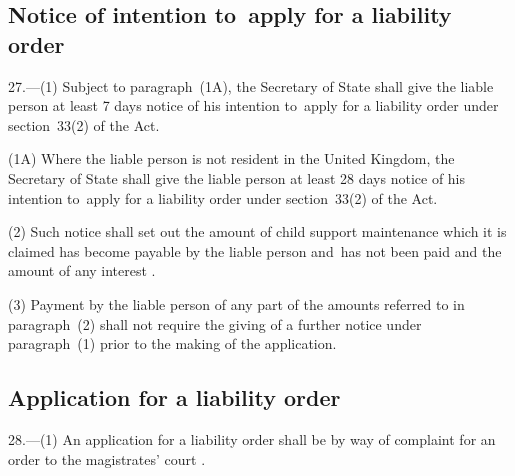 \documentclass[12pt,a4paper]{article}
\begin{document}
\subsection[27. Notice of intention to~apply for a liability order]{Notice of intention to~apply for a liability order}

27.—(1) 
Subject to paragraph~(1A),  %
the Secretary of State shall give the liable person at least 7 days notice of his intention to~apply for a liability order under section~33(2) of the Act.

(1A) Where the liable person is not resident in the United Kingdom, the Secretary of State shall give the liable person at least 28 days notice of his intention to~apply for a liability order under section~33(2) of the Act.

(2) Such notice shall set out the amount of child support maintenance which it is claimed has become payable by the liable person and~has not been paid and the amount of any interest%
.  %

(3) Payment by the liable person of any part of the amounts referred to in paragraph~(2) shall not require the giving of a further notice under paragraph~(1) prior to the making of the application.


\subsection[28. Application for a liability order]{Application for a liability order}

28.—(1) An application for a liability order shall be by way of complaint for an order to the magistrates' court%
.
\end{document}
